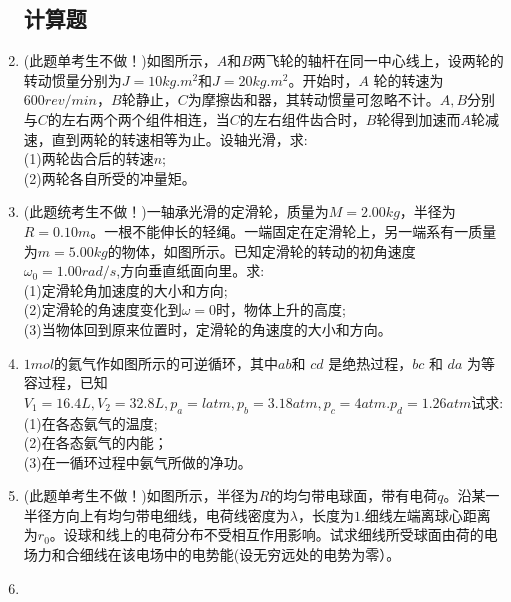 \begin{enumerate}
\subsection{计算题}
\item (此题单考生不做！)如图所示，$A$和$B$两飞轮的轴杆在同一中心线上，设两轮的转动惯量分别为$J=10kg.m^2$和$J=20kg.m^2$。开始时，$A$ 轮的转速为 $600rev/min$，$B$轮静止，$C$为摩擦齿和器，其转动惯量可忽略不计。$A,B$分别与$C$的左右两个两个组件相连，当$C$的左右组件齿合时，$B$轮得到加速而$A$轮减速，直到两轮的转速相等为止。设轴光滑，求:\\
(1)两轮齿合后的转速$n$;\\
(2)两轮各自所受的冲量矩。
\item (此题统考生不做！)一轴承光滑的定滑轮，质量为$M=2.00kg$，半径为$ R=0.10m$。一根不能伸长的轻绳。一端固定在定滑轮上，另一端系有一质量为$m=5.00kg $的物体，如图所示。已知定滑轮的转动的初角速度 $\omega_0=1.00 rad/s$,方向垂直纸面向里。求:\\
(1)定滑轮角加速度的大小和方向;\\
(2)定滑轮的角速度变化到$\omega=0$时，物体上升的高度;\\
(3)当物体回到原来位置时，定滑轮的角速度的大小和方向。
\item $1 mol $的氦气作如图所示的可逆循环，其中$ ab $和 $cd$ 是绝热过程，$bc$ 和 $da$ 为等容过程，已知$V_1=16.4L,V_2=32.8L,p_a=l atm,p_b=3.18 atm,p_c=4 atm. p_d=1.26 atm $试求:\\
(1)在各态氨气的温度;\\
(2)在各态氨气的内能；\\
(3)在一循环过程中氨气所做的净功。
\item (此题单考生不做！)如图所示，半径为$R$的均匀带电球面，带有电荷$q$。沿某一半径方向上有均匀带电细线，电荷线密度为$\lambda$，长度为$1$.细线左端离球心距离为$r_0$。设球和线上的电荷分布不受相互作用影响。试求细线所受球面由荷的电场力和合细线在该电场中的电势能(设无穷远处的电势为零）。
\item 
\end{enumerate}